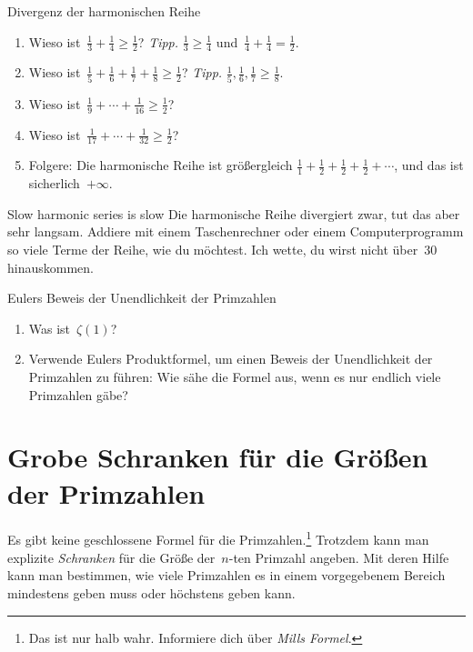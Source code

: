 \documentclass[twoside]{../zirkelblatt1415}
\theoremstyle{definition}
\theoremstyle{plain}
\theoremstyle{remark}
\begin{document}
\begin{aufgabe}{Divergenz der harmonischen Reihe}
\begin{enumerate}
\item Wieso ist~$\frac{1}{3} + \frac{1}{4} \geq \frac{1}{2}$?
\tabto{6cm}
\emph{Tipp.} $\frac{1}{3} \geq \frac{1}{4}$ und~$\frac{1}{4} + \frac{1}{4} =
\frac{1}{2}$.
\item Wieso ist~$\frac{1}{5} + \frac{1}{6} + \frac{1}{7} + \frac{1}{8} \geq \frac{1}{2}$?
\tabto{6cm}
\emph{Tipp.} $\frac{1}{5}, \frac{1}{6}, \frac{1}{7} \geq \frac{1}{8}$.

\item Wieso ist~$\frac{1}{9} + \cdots + \frac{1}{16} \geq \frac{1}{2}$?

\item Wieso ist~$\frac{1}{17} + \cdots + \frac{1}{32} \geq \frac{1}{2}$?

\item Folgere: Die harmonische Reihe ist größergleich
$\frac{1}{1} + \frac{1}{2} + \frac{1}{2} + \frac{1}{2} + \cdots$,
und das ist sicherlich~$+\infty$.
\end{enumerate}\fixlistspacing
\end{aufgabe}

\begin{aufgabe}{Slow harmonic series is slow}
Die harmonische Reihe divergiert zwar, tut das aber sehr langsam. Addiere mit
einem Taschenrechner oder einem Computerprogramm so viele Terme der Reihe, wie
du möchtest. Ich wette, du wirst nicht über~$30$ hinauskommen.
\end{aufgabe}

\begin{aufgabe}{Eulers Beweis der Unendlichkeit der Primzahlen}
\begin{enumerate}
\item Was ist~$\zeta(1)$?
\item Verwende Eulers Produktformel, um einen Beweis der
Unendlichkeit der Primzahlen zu führen: Wie sähe die Formel aus, wenn es nur
endlich viele Primzahlen gäbe?
\end{enumerate}\fixlistspacing
\end{aufgabe}


\section{Grobe Schranken für die Größen der Primzahlen}

Es gibt keine geschlossene Formel für die Primzahlen.\footnote{Das ist nur halb
wahr. Informiere dich über \emph{Mills Formel}.} Trotzdem kann man explizite
\emph{Schranken} für die Größe der~$n$-ten Primzahl angeben. Mit deren Hilfe
kann man bestimmen, wie viele Primzahlen es in einem vorgegebenem Bereich
mindestens geben muss oder höchstens geben kann.
\end{document}
